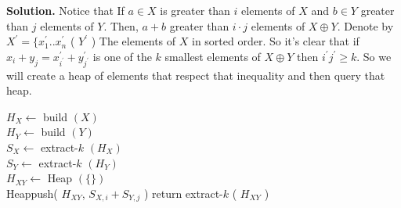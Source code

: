 \textbf{Solution.} Notice that If $a \in X$ is greater than $i$ elements of $X$ and $b \in Y$ greater than $j$ elements of $Y$. Then, $a + b$  greater than $i\cdot j$ elements of $X \oplus Y$. Denote by $X^\prime = \{ x^{\prime}_{1} .. x^{\prime}_{n}$ ( $Y^{\prime}$ ) The elements of $X$ in sorted order. So it's clear that if $x_{i}+y_{j} = x^{\prime}_{i^{\prime}} + y^{\prime}_{j^{\prime}}$ is one of the $k$ smallest elements of $X\oplus Y$ then $i^{\prime}j^{\prime} \ge k$. So we will create a heap of elements that respect that inequality and then query that heap.

\begin{algorithm}
$ H_{X} \leftarrow $ build $\left( X \right)$  \\ 
$ H_{Y} \leftarrow $ build $\left( Y \right)$  \\
$ S_{X} \leftarrow $ extract-$k$ $\left( H_{X} \right)$  \\ 
$ S_{Y} \leftarrow $ extract-$k$ $\left( H_{Y} \right)$  \\
$ H_{XY} \leftarrow $ Heap $(\{ \} )$ \\
 {
   {
  	Heappush( $H_{XY}$, $S_{X,i} + S_{Y, j}$ )    
  }
}
return extract-$k$ ( $H_{XY}$ ) 
\end{algorithm}


\newpage

\fi





